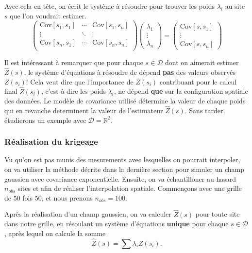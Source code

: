 \documentclass[10pt]{article} %
\begin{document}
Avec cela en tête, on écrit le système à résoudre pour trouver les poids $\lambda_i$ au site $s$ que l'on voudrait estimer.
\begin{equation}
\begin{pmatrix}
    \text{Cov}[s_1, s_1] & \cdots & \text{Cov}[s_1, s_n] \\
    \vdots & \ddots & \vdots \\
    \text{Cov}[s_n, s_1] & \cdots & \text{Cov}[s_n, s_n] \\
\end{pmatrix}
\begin{pmatrix}
    \lambda_1 \\
    \vdots \\
    \lambda_n
\end{pmatrix}
=
\begin{pmatrix}
    \text{Cov}[s, s_1] \\
    \vdots \\
    \text{Cov}[s, s_n]
\end{pmatrix}
\end{equation}

Il est intéressant à remarquer que pour chaque $s \in \mathcal{D}$ dont on aimerait estimer $\hat Z(s)$, le système d'équations à résoudre de dépend
\textbf{pas} des valeurs observés $Z(s_i)$! Cela veut dire que l'importance de $Z(s_i)$ contribuant pour le calcul final $\hat Z(s_i)$, c'est-à-dire les poids $\lambda_i$, ne dépend \textbf{que}
sur la configuration spatiale des données. Le modèle de covariance utilisé détermine la valeur de chaque poids qui en revanche determinent la valeur de l'estimateur
$\hat Z(s)$. Sans tarder, étudierons un exemple avec $\mathcal{D} = \mathbb{R}^2$.

\subsubsection{Réalisation du krigeage}

Vu qu'on est pas munis des mesurements avec lesquelles on pourrait interpoler, on va utiliser la méthode décrite dans la dernière section pour simuler un champ gaussien
avec covariance exponentielle. Ensuite, on va échantilloner au hasard $n_{obs}$ sites et afin de réaliser l'interpolation spatiale. Commen\c cons avec une grille de 50 fois 50,
et nous prenons $n_{obs} = 100$.

Après la réalisation d'un champ gaussien, on va calculer $\hat Z(s)$ pour toute site dans notre grille, en résoulant un système d'équations \textbf{unique} pour chaque $s \in \mathcal{D}$, après
lequel on calcule la somme $$ \hat Z(s) =  \sum \lambda_i Z(s_i).$$
\newpage
\end{document}

